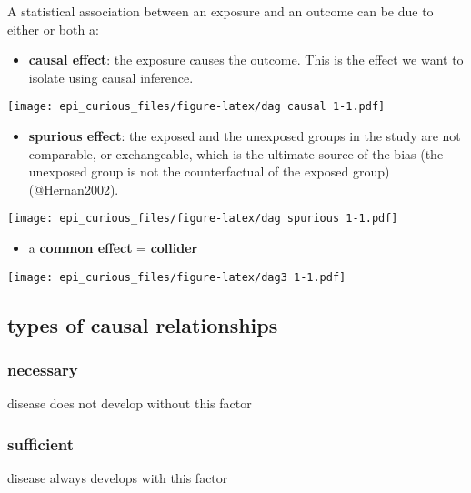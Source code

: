 \documentclass[
]{article}
\providecommand{\tightlist}{%
  \setlength{\itemsep}{0pt}\setlength{\parskip}{0pt}}
\begin{document}
A statistical association between an exposure and an outcome can be due
to either or both a:

\begin{itemize}
\tightlist
\item
  \textbf{causal effect}: the exposure causes the outcome. This is the
  effect we want to isolate using causal inference.
\end{itemize}

\texttt{[image: epi\_curious\_files/figure-latex/dag causal 1-1.pdf]}

\begin{itemize}
\tightlist
\item
  \textbf{spurious effect}: the exposed and the unexposed groups in the
  study are not comparable, or exchangeable, which is the ultimate
  source of the bias (the unexposed group is not the counterfactual of
  the exposed group) (@Hernan2002).
\end{itemize}

\texttt{[image: epi\_curious\_files/figure-latex/dag spurious 1-1.pdf]}

\begin{itemize}
\tightlist
\item
  a \textbf{common effect} = \textbf{collider}
\end{itemize}

\texttt{[image: epi\_curious\_files/figure-latex/dag3 1-1.pdf]}

\hypertarget{types-of-causal-relationships}{%
\subsection{types of causal
relationships}\label{types-of-causal-relationships}}

\hypertarget{necessary}{%
\subsubsection{necessary}\label{necessary}}

disease does not develop without this factor

\hypertarget{sufficient}{%
\subsubsection{sufficient}\label{sufficient}}

disease always develops with this factor
\end{document}
